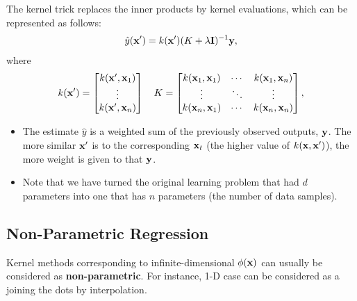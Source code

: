 The kernel trick replaces the inner products by kernel evaluations, which can be represented as follows:
\begin{align*}
	\hat{y}({\mathbf{x}}') = k({\mathbf{x}}')(K+\lambda \mathbf{I})^{-1}{\mathbf{y}},
\end{align*}
where 
\begin{align*}
	k({\mathbf{x}}') = \begin{bmatrix}
		k({\mathbf{x}}', {\mathbf{x}}_1)\\
		\vdots\\
		k({\mathbf{x}}', {\mathbf{x}}_n)
	\end{bmatrix}\quad
	K = \begin{bmatrix}
		k({\mathbf{x}}_1, {\mathbf{x}}_1) & \cdots & k({\mathbf{x}}_1, {\mathbf{x}}_n)\\
		\vdots & \ddots & \vdots\\
		k({\mathbf{x}}_n, {\mathbf{x}}_1) & \cdots & k({\mathbf{x}}_n, {\mathbf{x}}_n)
	\end{bmatrix},
\end{align*}
\begin{itemize}
	\item The estimate $\hat{y}$ is a weighted sum of the previously observed outputs, ${\mathbf{y}}$. The more similar ${\mathbf{x}}'$ is to the corresponding ${\mathbf{x}}_t$ (\ie the higher value of $k({\mathbf{x}}, {\mathbf{x}}')$), the more weight is given to that ${\mathbf{y}}$. 
	\item Note that we have turned the original learning problem that had $d$ parameters into one that has $n$ parameters (\ie the number of data samples). 
\end{itemize}


\subsection{Non-Parametric Regression}
Kernel methods corresponding to infinite-dimensional $\phi({\mathbf{x}})$ can usually be considered as \textbf{non-parametric}.
For instance, 1-D case can be considered as a joining the dots by interpolation. 












